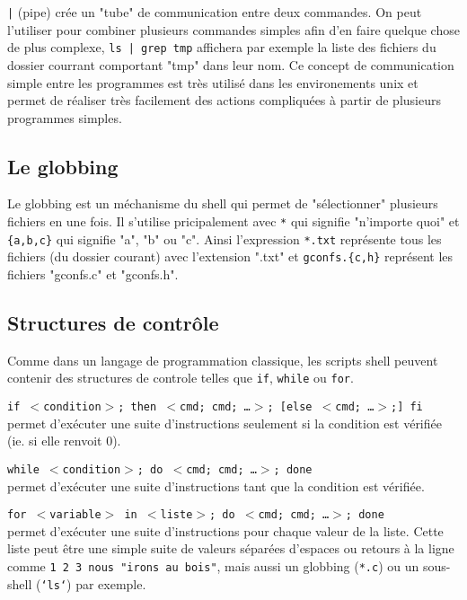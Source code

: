 \documentclass{article}
\begin{document}
\par \texttt{|} (pipe) crée un "tube" de communication entre deux commandes.
On peut l'utiliser pour combiner plusieurs commandes simples afin d'en faire quelque chose de plus complexe,
\texttt{ls | grep tmp} affichera par exemple la liste des fichiers du dossier courrant comportant "tmp" dans leur nom. Ce concept de communication simple entre les programmes est très utilisé dans les environements unix et permet de réaliser très facilement des actions compliquées à partir de plusieurs programmes simples.\\

\subsection{Le globbing}

Le globbing est un méchanisme du shell qui permet de "sélectionner" plusieurs fichiers en une fois.
Il s'utilise pricipalement avec \texttt{*} qui signifie "n'importe quoi" et \texttt{\{a,b,c\}} qui signifie "a", "b" ou "c".
Ainsi l'expression \texttt{*.txt} représente tous les fichiers (du dossier courant) avec l'extension ".txt" et \texttt{gconfs.\{c,h\}} représent les fichiers "gconfs.c" et "gconfs.h".

\subsection{Structures de contrôle}

Comme dans un langage de programmation classique, les scripts shell peuvent contenir des structures de controle telles que \texttt{if}, \texttt{while} ou \texttt{for}.\\

\par \texttt{if $<$condition$>$; then $<$cmd; cmd; …$>$; [else $<$cmd; …$>$;] fi}\\ permet d'exécuter une suite d'instructions seulement si la condition est vérifiée (ie. si elle renvoit 0).\\

\par \texttt{while $<$condition$>$; do $<$cmd; cmd; …$>$; done}\\ permet d'exécuter une suite d'instructions tant que la condition est vérifiée.\\

\par \texttt{for $<$variable$>$ in $<$liste$>$; do $<$cmd; cmd; …$>$; done}\\ permet d'exécuter une suite d'instructions pour chaque valeur de la liste.
Cette liste peut être une simple suite de valeurs séparées d'espaces ou retours à la ligne comme \texttt{1 2 3 nous "irons au bois"}, mais aussi un globbing (\texttt{*.c}) ou un sous-shell (\texttt{`ls`}) par exemple.\\
\end{document}
